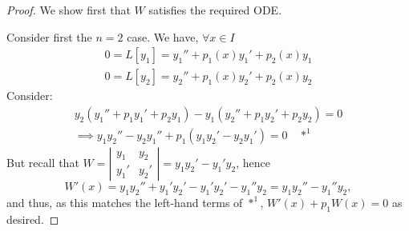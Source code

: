\begin{proof}
We show first that $W$ satisfies the required ODE.

Consider first the $n=2$ case. We have, $\forall x \in I$\begin{align*}
    0 = L[y_1] = y_1'' + p_1(x)y_1' + p_2(x)y_1\\
    0 = L[y_2] = y_2'' + p_1(x)y_2' + p_2(x)y_2
 \end{align*}
Consider:
\begin{align*}
    y_2(y_1''+p_1y_1'+p_2y_1)-y_1(y_2''+p_1y_2'+p_2y_2) = 0\\
    \implies y_1y_2''-y_2y_1''+p_1(y_1y_2'-y_2y_1')=0 \quad \ast^1
\end{align*}
But recall that $W = \left|\begin{matrix}
    y_1 & y_2\\
    y_1' & y_2'
\end{matrix}\right| = y_1 y_2'-y_1'y_2$, hence \[
W'(x) = y_1y_2''+y_1'y_2'-y_1'y_2'-y_1''y_2 = y_1y_2''-y_1''y_2,    
\]
and thus, as this matches the left-hand terms of $\ast^1$, $W'(x) + p_1 W(x) = 0$ as desired. 


\end{proof}
